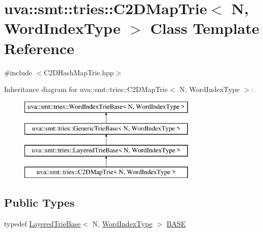 \hypertarget{classuva_1_1smt_1_1tries_1_1_c2_d_map_trie}{}\section{uva\+:\+:smt\+:\+:tries\+:\+:C2\+D\+Map\+Trie$<$ N, Word\+Index\+Type $>$ Class Template Reference}
\label{classuva_1_1smt_1_1tries_1_1_c2_d_map_trie}


{\ttfamily \#include $<$C2\+D\+Hash\+Map\+Trie.\+hpp$>$}

Inheritance diagram for uva\+:\+:smt\+:\+:tries\+:\+:C2\+D\+Map\+Trie$<$ N, Word\+Index\+Type $>$\+:\begin{figure}[H]
\begin{center}
\leavevmode
\includegraphics[height=4.000000cm]{classuva_1_1smt_1_1tries_1_1_c2_d_map_trie}
\end{center}
\end{figure}
\subsection*{Public Types}
\begin{DoxyCompactItemize}
\item 
typedef \hyperlink{classuva_1_1smt_1_1tries_1_1_layered_trie_base}{Layered\+Trie\+Base}$<$ N, \hyperlink{classuva_1_1smt_1_1tries_1_1_word_index_trie_base_a30c4fffe3a3423c87b229b66340dd2f8}{Word\+Index\+Type} $>$ \hyperlink{classuva_1_1smt_1_1tries_1_1_c2_d_map_trie_ab3edfe4a537868a96d867ace37607fee}{B\+A\+S\+E}
\end{DoxyCompactItemize}
